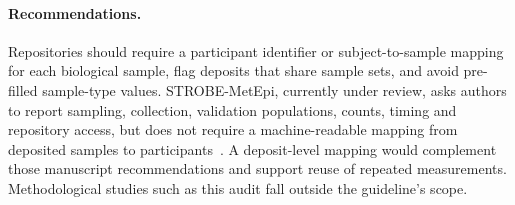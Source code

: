 \paragraph{Recommendations.} Repositories should require a participant identifier or subject-to-sample mapping for each biological sample, flag deposits that share sample sets, and avoid pre-filled sample-type values. STROBE-MetEpi, currently under review, asks authors to report sampling, collection, validation populations, counts, timing and repository access, but does not require a machine-readable mapping from deposited samples to participants~\citep{kelly2026strobe}. A deposit-level mapping would complement those manuscript recommendations and support reuse of repeated measurements. Methodological studies such as this audit fall outside the guideline's scope.
